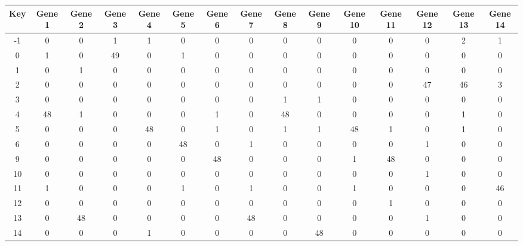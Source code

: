 \begin{tabular}{|c|c|c|c|c|c|c|c|c|c|c|c|c|c|c|}
\hline
Key & Gene 1 & Gene 2 & Gene 3 & Gene 4 & Gene 5 & Gene 6 & Gene 7 & Gene 8 & Gene 9 & Gene 10 & Gene 11 & Gene 12 & Gene 13 & Gene 14 \\
\hline
-1 & 0 & 0 & 1 & 1 & 0 & 0 & 0 & 0 & 0 & 0 & 0 & 0 & 2 & 1 \\
0 & 1 & 0 & 49 & 0 & 1 & 0 & 0 & 0 & 0 & 0 & 0 & 0 & 0 & 0 \\
1 & 0 & 1 & 0 & 0 & 0 & 0 & 0 & 0 & 0 & 0 & 0 & 0 & 0 & 0 \\
2 & 0 & 0 & 0 & 0 & 0 & 0 & 0 & 0 & 0 & 0 & 0 & 47 & 46 & 3 \\
3 & 0 & 0 & 0 & 0 & 0 & 0 & 0 & 1 & 1 & 0 & 0 & 0 & 0 & 0 \\
4 & 48 & 1 & 0 & 0 & 0 & 1 & 0 & 48 & 0 & 0 & 0 & 0 & 1 & 0 \\
5 & 0 & 0 & 0 & 48 & 0 & 1 & 0 & 1 & 1 & 48 & 1 & 0 & 1 & 0 \\
6 & 0 & 0 & 0 & 0 & 48 & 0 & 1 & 0 & 0 & 0 & 0 & 1 & 0 & 0 \\
9 & 0 & 0 & 0 & 0 & 0 & 48 & 0 & 0 & 0 & 1 & 48 & 0 & 0 & 0 \\
10 & 0 & 0 & 0 & 0 & 0 & 0 & 0 & 0 & 0 & 0 & 0 & 1 & 0 & 0 \\
11 & 1 & 0 & 0 & 0 & 1 & 0 & 1 & 0 & 0 & 1 & 0 & 0 & 0 & 46 \\
12 & 0 & 0 & 0 & 0 & 0 & 0 & 0 & 0 & 0 & 0 & 1 & 0 & 0 & 0 \\
13 & 0 & 48 & 0 & 0 & 0 & 0 & 48 & 0 & 0 & 0 & 0 & 1 & 0 & 0 \\
14 & 0 & 0 & 0 & 1 & 0 & 0 & 0 & 0 & 48 & 0 & 0 & 0 & 0 & 0 \\
\hline
\end{tabular}
